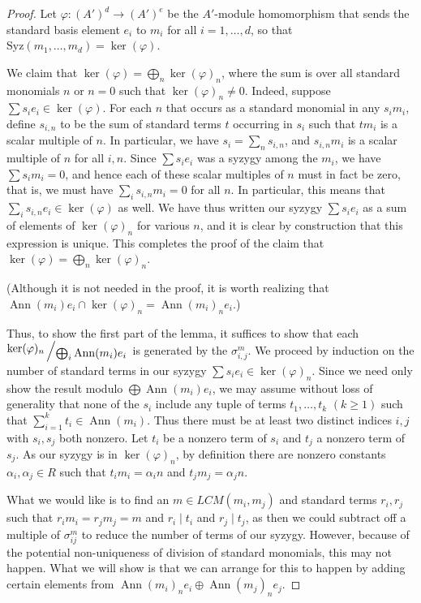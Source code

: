 \documentclass[11pt,reqno]{amsart}
\newcommand{\bigslant}[2]{{\raisebox{.2em}{$#1$}\left/\raisebox{-.2em}{$#2$}\right.}}
\newcommand{\divides}{\mid}
\DeclareMathOperator{\Ann}{Ann}
\newcommand{\Syz}{\text{Syz}}
\theoremstyle{definition}
\numberwithin{equation}{section}
\begin{document}
\begin{proof}
Let $\varphi \colon (A')^d \to (A')^e$ be the $A'$-module homomorphism that sends the standard basis element $e_i$ to $m_i$ for all $i=1,\dotsc,d$, so that $\Syz(m_1,\dotsc,m_d) = \ker(\varphi)$.

We claim that $\ker(\varphi) = \bigoplus_n \ker(\varphi)_n$, where the sum is over all standard monomials $n$ or $n=0$ such that $\ker(\varphi)_n \neq 0$. Indeed, suppose $\sum s_i e_i \in \ker(\varphi)$. For each $n$ that occurs as a standard monomial in any $s_i m_i$, define $s_{i,n}$ to be the sum of standard terms $t$ occurring in $s_i$ such that $tm_i$ is a scalar multiple of $n$. In particular, we have $s_i = \sum_n s_{i,n}$, and $s_{i,n} m_i$ is a scalar multiple of $n$ for all $i,n$. Since $\sum s_i e_i$ was a syzygy among the $m_i$, we have $\sum s_i m_i = 0$, and hence each of these scalar multiples of $n$ must in fact be zero, that is, we must have $\sum_i s_{i,n} m_i = 0$ for all $n$. In particular, this means that $\sum_i s_{i,n} e_i \in \ker(\varphi)$ as well. We have thus written our syzygy $\sum s_i e_i$ as a sum of elements of $\ker(\varphi)_n$ for various $n$, and it is clear by construction that this expression is unique. This completes the proof of the claim that $\ker(\varphi) = \bigoplus_n \ker(\varphi)_n$.

(Although it is not needed in the proof, it is worth realizing that 
\(
\Ann(m_i) e_i \cap \ker(\varphi)_n = \Ann(m_i)_n e_i.
\))

Thus, to show the first part of the lemma, it suffices to show that each $\bigslant{\ker(\varphi)_n}{\bigoplus_i \Ann(m_i) e_i}$ is generated by the $\sigma_{i,j}^m$. We proceed by induction on the number of standard terms in our syzygy $\sum s_i e_i \in \ker(\varphi)_n$. Since we need only show the result modulo $\bigoplus \Ann(m_i) e_i$, we may assume without loss of generality that none of the $s_i$ include any tuple of terms $t_1,\dotsc,t_k$ $(k \geq 1)$ such that $\sum_{i=1}^k t_i \in \Ann(m_i)$. Thus there must be at least two distinct indices $i,j$ with $s_i,s_j$ both nonzero. Let $t_i$ be a nonzero term of $s_i$ and $t_j$ a nonzero term of $s_j$. As our syzygy is in $\ker(\varphi)_n$, by definition there are nonzero constants $\alpha_i, \alpha_j \in R$ such that $t_i m_i = \alpha_i n$ and $t_j m_j = \alpha_j n$. 

What we would like is to find an $m \in LCM(m_i, m_j)$ and standard terms $r_i, r_j$ such that $r_i m_i = r_j m_j = m$ and $r_i \divides t_i$ and $r_j \divides t_j$, as then we could subtract off a multiple of $\sigma_{ij}^m$ to reduce the number of terms of our syzygy. However, because of the potential non-uniqueness of division of standard monomials, this may not happen. What we will show is that we can arrange for this to happen by adding certain elements from $\Ann(m_i)_n e_i \oplus \Ann(m_j)_n e_j$.


\end{proof}
\end{document}
